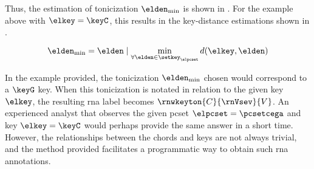Thus, the estimation of tonicization $\elden_{\min}$ is
shown in . For the example
above with $\elkey = \keyC$, this results in the
key-distance estimations shown in
.

\begin{equation}
    \label{eq:tonicization_estimation}
    \elden_{\min} = \elden \mid \min_{\forall \elden \in \setkey_\elpcset} d(\elkey, \elden)
\end{equation}


In the example provided, the tonicization $\elden_{\min}$
chosen would correspond to a $\keyG$ key. When this
tonicization is notated in relation to the given key
$\elkey$, the resulting \gls{rna} label becomes
$\rnwkeyton{C}{\rnVsev}{V}$. An experienced analyst that
observes the given \gls{pcset} $\elpcset = \pcsetcega$ and
key $\elkey = \keyC$ would perhaps provide the same answer
in a short time. 
However, the relationships between the chords and keys are
not always trivial, and the method provided facilitates a
programmatic way to obtain such \gls{rna} annotations.
